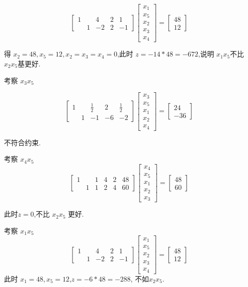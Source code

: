 \documentclass[a4paper]{article}
\begin{document}
\[
\begin{bmatrix}
1 &   & 4 & 2 & 1\\
  & 1 & -2 & 2 & -1
\end{bmatrix}
\begin{bmatrix}
    x_1 \\ x_5 \\ x_2 \\ x_3 \\ x_4
\end{bmatrix} 
= \begin{bmatrix}
   48 \\ 12
\end{bmatrix}
\]

得 $x_2 = 48, x_5 = 12, x_2 = x_3 = x_4 = 0$,此时 $z = -14 * 48 = -672$,说明 $x_1x_5$不比$x_2x_5$基更好.


考察 $x_3x_5$

\[
\begin{bmatrix}
1 &   & \frac{1}{2} & 2 & \frac{1}{2}  \\
  & 1 & -1 & -6 & -2 
\end{bmatrix}
\begin{bmatrix}
    x_3 \\ x_5 \\ x_1 \\ x_2 \\ x_4
\end{bmatrix} 
= \begin{bmatrix}
  24 \\- 36
\end{bmatrix}
\]

不符合约束.


考察 $x_4x_5$
\[
\begin{bmatrix}
1 &   & 1 & 4 & 2 & 48 \\
  & 1 & 1 & 2 & 4 & 60
\end{bmatrix}
\begin{bmatrix}
    x_4 \\ x_5 \\ x_1 \\ x_2 \\ x_3
\end{bmatrix} 
= \begin{bmatrix}
  48 \\ 60
\end{bmatrix}
\]

此时$z = 0$,不比 $x_2 x_5$ 更好.

考察 $x_1x_5$
\[
\begin{bmatrix}
1 &   & 4 & 2 & 1 \\
  & 1 & -2 & 2 & -1
\end{bmatrix}
\begin{bmatrix}
    x_1 \\ x_5 \\ x_2 \\ x_3 \\ x_4
\end{bmatrix} 
= \begin{bmatrix}
  48 \\ 12
\end{bmatrix}
\]
此时 $x_1 = 48,x_5 = 12$,$z = -6 * 48 = -288 $, 不如$x_2x_5$.
\end{document}
